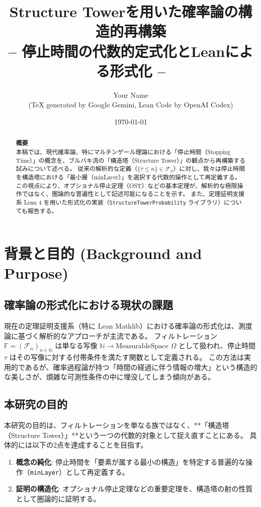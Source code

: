 \documentclass[11pt, a4paper]{article}
\title{\textbf{Structure Towerを用いた確率論の構造的再構築} \\
\large -- 停止時間の代数的定式化とLeanによる形式化 --}
\author{Your Name \\ (TeX generated by Google Gemini, Lean Code by OpenAI Codex)}
\date{\today}
\begin{document}
\maketitle

\begin{abstract}
\textbf{概要} \\
本稿では、現代確率論、特にマルチンゲール理論における「停止時間（Stopping Time）」の概念を、ブルバキ流の「構造塔（Structure Tower）」の観点から再構築する試みについて述べる。
従来の解析的な定義（$\{\tau \le n\} \in \mathcal{F}_n$）に対し、我々は停止時間を構造塔における「最小層（minLayer）」を選択する代数的操作として再定義する。
この視点により、オプショナル停止定理（OST）などの基本定理が、解析的な極限操作ではなく、圏論的な普遍性として記述可能になることを示す。
また、定理証明支援系 Lean 4 を用いた形式化の実装（\texttt{StructureTowerProbability} ライブラリ）についても報告する。
\end{abstract}

\tableofcontents
\newpage

\section{背景と目的 (Background and Purpose)}

\subsection{確率論の形式化における現状の課題}
現在の定理証明支援系（特に Lean Mathlib）における確率論の形式化は、測度論に基づく解析的なアプローチが主流である。
フィルトレーション $\mathbb{F} = (\mathcal{F}_n)_{n \in \mathbb{N}}$ は単なる写像 $\mathbb{N} \to \text{MeasurableSpace } \Omega$ として扱われ、停止時間 $\tau$ はその写像に対する付帯条件を満たす関数として定義される。
この方法は実用的であるが、確率過程論が持つ「時間の経過に伴う情報の増大」という構造的な美しさが、煩雑な可測性条件の中に埋没してしまう傾向がある。

\subsection{本研究の目的}
本研究の目的は、フィルトレーションを単なる族ではなく、**「構造塔（Structure Tower）」**という一つの代数的対象として捉え直すことにある。
具体的には以下の2点を達成することを目指す。
\begin{enumerate}
    \item \textbf{概念の純化}: 停止時間を「要素が属する最小の構造」を特定する普遍的な操作（\texttt{minLayer}）として再定義する。
    \item \textbf{証明の構造化}: オプショナル停止定理などの重要定理を、構造塔の射の性質として圏論的に証明する。
\end{enumerate}
\end{document}
